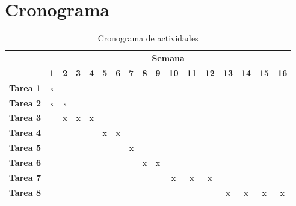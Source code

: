 \section{Cronograma}
	\begin{table}[h]
		\centering
		\caption{Cronograma de actividades}
		\label{tb: cronograma}
		\footnotesize
		\begin{tabular}{|c|c|c|c|c|c|c|c|c|c|c|c|c|c|c|c|c|}
			\hline
			\rowcolor[HTML]{C0C0C0} 
			\cellcolor[HTML]{C0C0C0}                                       & \multicolumn{16}{c|}{\cellcolor[HTML]{C0C0C0}\textbf{Semana}} \\ \cline{2-17} 
			\rowcolor[HTML]{EFEFEF} 
			\multirow{-2}{*}{\cellcolor[HTML]{C0C0C0}\textbf{Actividades}} & \textbf{1} & \textbf{2} & \textbf{3} & \textbf{4} & \textbf{5} & \textbf{6} & \textbf{7} & \textbf{8} & \textbf{9} & \textbf{10} & \textbf{11} & \textbf{12} & \textbf{13} & \textbf{14} & \textbf{15} & \textbf{16} \\ \hline
			\cellcolor[HTML]{EFEFEF}
			\textbf{Tarea 1} & x & & & & & & & & & & & & & & & \\ \hline
			\cellcolor[HTML]{EFEFEF}
			\textbf{Tarea 2} & x & x & & & & & & & & & & & & & & \\ \hline
			\cellcolor[HTML]{EFEFEF}
			\textbf{Tarea 3} & & x & x & x & & & & & & & & & & & & \\ \hline
			\cellcolor[HTML]{EFEFEF}
			\textbf{Tarea 4} & & & & & x & x & & & & & & & & & & \\ \hline
			\cellcolor[HTML]{EFEFEF}
			\textbf{Tarea 5} & & & & & & & x & & & & & & & & & \\ \hline
			\cellcolor[HTML]{EFEFEF}
			\textbf{Tarea 6} & & & & & & & & x & x & & & & & & & \\ \hline
			\cellcolor[HTML]{EFEFEF}
			\textbf{Tarea 7} & & & & & & & & & & x & x & x & & & & \\ \hline
			\cellcolor[HTML]{EFEFEF}
			\textbf{Tarea 8} & & & & & & & & & & & & & x & x & x & x \\ \hline
		\end{tabular}
	\end{table}
